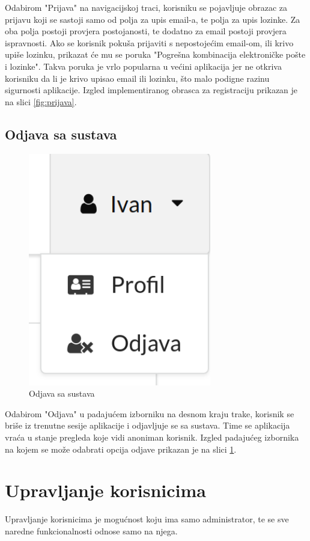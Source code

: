 \documentclass[zavrsni, numeric]{fer}
\begin{document}
Odabirom "Prijava" na navigacijskoj traci, korisniku se pojavljuje obrazac za prijavu koji se sastoji samo od polja za upis email-a, te polja za upis lozinke. Za oba polja postoji provjera postojanosti, te dodatno za email postoji provjera ispravnosti. Ako se korisnik pokuša prijaviti s nepostojećim email-om, ili krivo upiše lozinku, prikazat će mu se poruka "Pogrešna kombinacija elektroničke pošte i lozinke". Takva poruka je vrlo popularna u većini aplikacija jer ne otkriva korisniku da li je krivo upisao email ili lozinku, što malo podigne razinu sigurnosti aplikacije. Izgled implementiranog obrasca za registraciju prikazan je na slici \ref{fig:prijava}.

\subsection{Odjava sa sustava}

\begin{figure}[H]
	\centering
	\includegraphics[width=8cm]{slike/odjava.png}
	\caption{Odjava sa sustava}
	\label{fig:odjava}
\end{figure}
	
Odabirom "Odjava" u padajućem izborniku na desnom kraju trake, korisnik se briše iz trenutne sesije aplikacije i odjavljuje se sa sustava. Time se aplikacija vraća u stanje pregleda koje vidi anoniman korisnik. Izgled padajućeg izbornika na kojem se može odabrati opcija odjave prikazan je na slici \ref{fig:odjava}.

\section{Upravljanje korisnicima}
Upravljanje korisnicima je mogućnost koju ima samo administrator, te se sve naredne funkcionalnosti odnose samo na njega.
\end{document}

